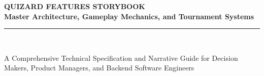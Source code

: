 \documentclass[11pt,a4paper,oneside]{report}
\begin{document}
\begin{titlepage}
    \centering
    \vspace*{1.5cm}
    
    {\Huge\bfseries\sffamily\color{primaryDark} QUIZARD FEATURES STORYBOOK}\\[0.4cm]
    {\LARGE\bfseries\sffamily\color{primaryBlue} Master Architecture, Gameplay Mechanics, and Tournament Systems}\\[0.8cm]
    
    \rule{\linewidth}{1.5pt}\\[1.0cm]
    
    \begin{tcolorbox}[colback=primaryBlue!5,colframe=primaryBlue,width=0.95\linewidth,arc=2mm]
        \centering
        \large\sffamily
        A Comprehensive Technical Specification and Narrative Guide for Decision Makers, Product Managers, and Backend Software Engineers
    \end{tcolorbox}
    
    \vspace{1.5cm}
    

\end{titlepage}
\end{document}
